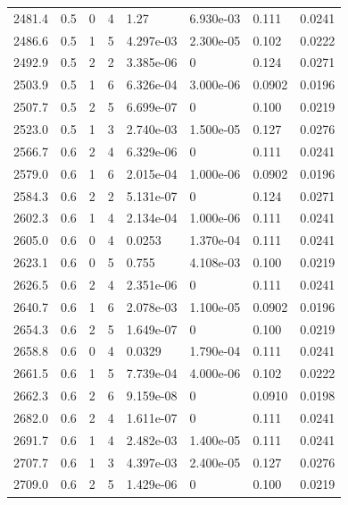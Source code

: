 \documentclass[preview]{standalone}
\begin{document}
{{{{{{\begin{tabular}{L{1.2cm}C{1.2cm} C{0.3cm}C{0.5cm} C{1.4cm}C{1.4cm} C{1.4cm}C{1.4cm}}
  2481.4  &   0.5  & 0     &  4 &  1.27  & 6.930e-03  & 0.111 &  0.0241   \\ 
  2486.6  &   0.5  & 1     &  5 &  4.297e-03  & 2.300e-05  & 0.102 &  0.0222   \\ 
  2492.9  &   0.5  & 2     &  2 &  3.385e-06  & 0  & 0.124 &  0.0271   \\ 
  2503.9  &   0.5  & 1     &  6 &  6.326e-04  & 3.000e-06  & 0.0902 &  0.0196   \\ 
  2507.7  &   0.5  & 2     &  5 &  6.699e-07  & 0  & 0.100 &  0.0219   \\ 
  2523.0  &   0.5  & 1     &  3 &  2.740e-03  & 1.500e-05  & 0.127 &  0.0276   \\ 
  2566.7  &   0.6  & 2     &  4 &  6.329e-06  & 0  & 0.111 &  0.0241   \\ 
  2579.0  &   0.6  & 1     &  6 &  2.015e-04  & 1.000e-06  & 0.0902 &  0.0196   \\ 
  2584.3  &   0.6  & 2     &  2 &  5.131e-07  & 0  & 0.124 &  0.0271   \\ 
  2602.3  &   0.6  & 1     &  4 &  2.134e-04  & 1.000e-06  & 0.111 &  0.0241   \\ 
  2605.0  &   0.6  & 0     &  4 &  0.0253  & 1.370e-04  & 0.111 &  0.0241   \\ 
  2623.1  &   0.6  & 0     &  5 &  0.755  & 4.108e-03  & 0.100 &  0.0219   \\ 
  2626.5  &   0.6  & 2     &  4 &  2.351e-06  & 0  & 0.111 &  0.0241   \\ 
  2640.7  &   0.6  & 1     &  6 &  2.078e-03  & 1.100e-05  & 0.0902 &  0.0196   \\ 
  2654.3  &   0.6  & 2     &  5 &  1.649e-07  & 0  & 0.100 &  0.0219   \\ 
  2658.8  &   0.6  & 0     &  4 &  0.0329  & 1.790e-04  & 0.111 &  0.0241   \\ 
  2661.5  &   0.6  & 1     &  5 &  7.739e-04  & 4.000e-06  & 0.102 &  0.0222   \\ 
  2662.3  &   0.6  & 2     &  6 &  9.159e-08  & 0  & 0.0910 &  0.0198   \\ 
  2682.0  &   0.6  & 2     &  4 &  1.611e-07  & 0  & 0.111 &  0.0241   \\ 
  2691.7  &   0.6  & 1     &  4 &  2.482e-03  & 1.400e-05  & 0.111 &  0.0241   \\ 
  2707.7  &   0.6  & 1     &  3 &  4.397e-03  & 2.400e-05  & 0.127 &  0.0276   \\ 
  2709.0  &   0.6  & 2     &  5 &  1.429e-06  & 0  & 0.100 &  0.0219   \\ 

\end{tabular}}}}}}}
\end{document}
